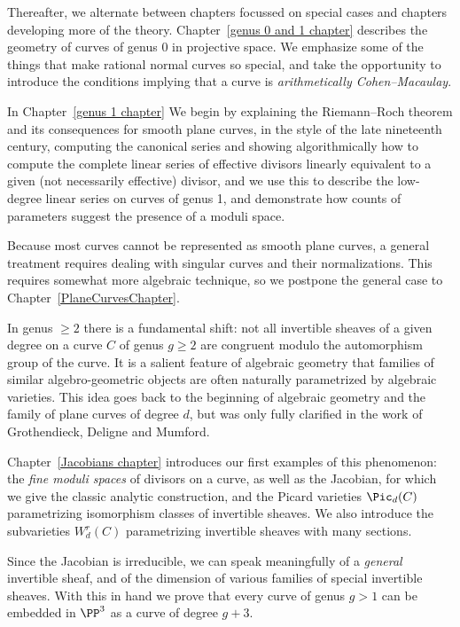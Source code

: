 Thereafter, we alternate between chapters focussed on special cases and chapters developing more of the theory. Chapter~\ref{genus 0 and 1 chapter}  describes the geometry of curves of genus 0  in projective space. We emphasize some of the things that make rational normal curves so special, and take the opportunity to introduce the conditions implying that a curve is \emph{arithmetically Cohen--Macaulay}. 

In Chapter~\ref{genus 1 chapter} We begin by explaining the
Riemann--Roch theorem and its consequences for smooth plane curves,  in
the style of the late 
nineteenth
century, computing the canonical series and showing algorithmically how to compute the complete linear series of effective divisors linearly equivalent to a given (not necessarily effective) divisor, and we use this 
to describe the low-degree linear series on curves of genus 1, and demonstrate how counts of parameters suggest the presence of a moduli space.

Because most curves cannot be represented as smooth plane curves, a general treatment requires dealing with
singular curves and their normalizations. This requires somewhat more algebraic technique, so we postpone the general case to Chapter~\ref{PlaneCurvesChapter}.  

In genus $\geq 2$ there is a fundamental shift: not all invertible sheaves of a given degree on a curve $C$ of genus $g \geq 2$ are congruent modulo the automorphism group of the curve.
It is a salient feature of algebraic geometry that families of similar algebro-geometric objects are often naturally parametrized by algebraic varieties. This idea goes back to the beginning of algebraic geometry and the family of plane curves of degree $d$, but was only fully clarified in the work of Grothendieck, Deligne and Mumford.
%
%

Chapter~\ref{Jacobians chapter} introduces our first examples of this phenomenon: the \emph{fine moduli spaces} of divisors on a curve, as well as the Jacobian, for which we give the classic analytic construction, and the Picard varieties $\Pic_d(C)$ parametrizing isomorphism classes of invertible sheaves. We also introduce the subvarieties $W^{r}_{d}(C)$ parametrizing invertible sheaves with many sections. 

 Since the Jacobian is irreducible, we can speak meaningfully of a \emph{general} invertible sheaf, and of the dimension of various families of special invertible sheaves. With this in hand we prove
that every curve of genus $g>1$ can be embedded in $\PP^{3}$ as a curve of degree $g+3$.

